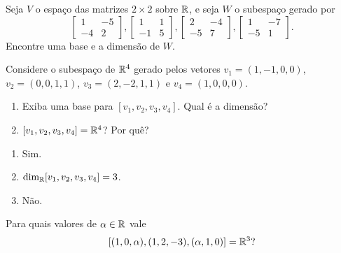 \documentclass[12pt]{exam}
\begin{document}
    \begin{exercicio}
        Seja $V$ o espa\c{c}o das matrizes $2 \times 2$ sobre $\mathbb{R}$, e seja $W$ o subespa\c{c}o gerado por
        \[
            \begin{bmatrix}
                1 & -5\\
                -4 & 2
            \end{bmatrix},
            \begin{bmatrix}
                1 & 1\\
                -1 & 5
            \end{bmatrix},
            \begin{bmatrix}
                2 & -4\\
                -5 & 7
            \end{bmatrix},
            \begin{bmatrix}
                1 & -7\\
                -5 & 1
            \end{bmatrix}.
        \]
        Encontre uma base e a dimens\~ao de $W$.
    \end{exercicio}

    \begin{exercicio}
        Considere o subespa\c{c}o de $\mathbb{R}^4$ gerado pelos vetores $v_1 = (1, -1, 0, 0)$, $v_2 = (0, 0, 1, 1)$, $v_3 = (2, -2, 1, 1)$ e $v_4 = (1, 0, 0, 0)$.
        \begin{enumerate}[label={\alph*})]
            \item Exiba uma base para $[v_1, v_2, v_3, v_4]$. Qual \'e a dimens\~ao?

            \item $[v_1, v_2, v_3, v_4] = \mathbb{R}^4$? Por qu\^e?
        \end{enumerate}
        \begin{solucao}
            \begin{enumerate}[label={\alph*})]
                \item Sim.

                \item $\dim_{\mathbb{R}} [v_1, v_2, v_3, v_4] = 3$.

                \item N\~ao.
            \end{enumerate}
        \end{solucao}
    \end{exercicio}

    \begin{exercicio}
        Para quais valores de $\alpha \in \mathbb{R}$ vale
        \[
            [(1, 0, \alpha), (1, 2, -3) , (\alpha, 1, 0)] = \mathbb{R}^3?
        \]
    \end{exercicio}
\end{document}
